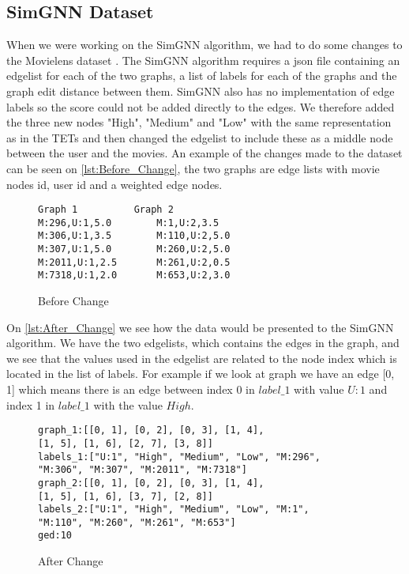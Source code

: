 \subsection{SimGNN Dataset}
When we were working on the SimGNN algorithm, we had to do some changes to the Movielens dataset \cite{Grouplensdata}. The SimGNN algorithm requires a json file containing an edgelist for each of the two graphs, a list of labels for each of the graphs and the graph edit distance between them. SimGNN also has no implementation of edge labels so the score could not be added directly to the edges. We therefore added the three new nodes "High", "Medium" and "Low" with the same representation as in the TETs and then changed the edgelist to include these as a middle node between the user and the movies. 
An example of the changes made to the dataset can be seen on \autoref{lst:Before_Change}, the two graphs are edge lists with movie nodes id, user id and a weighted edge nodes. 
\begin{figure}[H]
\begin{lstlisting}
Graph 1			 Graph 2
M:296,U:1,5.0		 M:1,U:2,3.5
M:306,U:1,3.5		 M:110,U:2,5.0
M:307,U:1,5.0		 M:260,U:2,5.0
M:2011,U:1,2.5 		 M:261,U:2,0.5
M:7318,U:1,2.0		 M:653,U:2,3.0
\end{lstlisting}
\caption{Before Change}
\label{lst:Before_Change}
\end{figure}
On \autoref{lst:After_Change} we see how the data would be presented to the SimGNN algorithm. We have the two edgelists, which contains the edges in the graph, and we see that the values used in the edgelist are related to the node index which is located in the list of labels. For example if we look at graph we have an edge [0, 1] which means there is an edge between index 0 in $label\_1$ with value $U:1$ and index 1 in $label\_1$ with the value  $High$.
\begin{figure}[H]
\begin{lstlisting}
graph_1:[[0, 1], [0, 2], [0, 3], [1, 4], 
[1, 5], [1, 6], [2, 7], [3, 8]]
labels_1:["U:1", "High", "Medium", "Low", "M:296", 
"M:306", "M:307", "M:2011", "M:7318"]
graph_2:[[0, 1], [0, 2], [0, 3], [1, 4], 
[1, 5], [1, 6], [3, 7], [2, 8]]
labels_2:["U:1", "High", "Medium", "Low", "M:1",
"M:110", "M:260", "M:261", "M:653"]
ged:10
\end{lstlisting}
\caption{After Change}
\label{lst:After_Change}
\end{figure}
